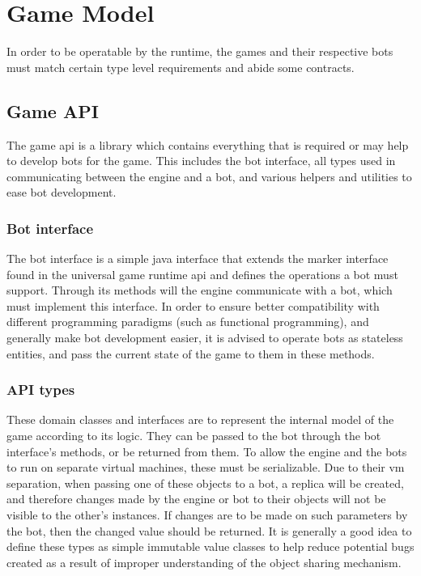 
%

\chapter{Game Model}\label{sect:GameModel}

In order to be operatable by the runtime, the games and their respective bots must match certain type level requirements and abide some contracts.

	\section{Game API}
	
	The game api is a library which contains everything that is required or may help to develop bots for the game. This includes the bot interface, all types used in communicating between the engine and a bot, and various helpers and utilities to ease bot development.

		\subsection*{Bot interface}
		
		The bot interface is a simple java interface that extends the  marker interface found in the universal game runtime api and defines the operations a bot must support. Through its methods will the engine communicate with a bot, which must implement this interface. In order to ensure better compatibility with different programming paradigms (such as functional programming), and generally make bot development easier, it is advised to operate bots as stateless entities, and pass the current state of the game to them in these methods. 
		
		\subsection*{API types}

		These domain classes and interfaces are to represent the internal model of the game according to its logic. They can be passed to the bot through the bot interface's methods, or be returned from them. To allow the engine and the bots to run on separate virtual machines, these must be serializable. Due to their vm separation, when passing one of these objects to a bot, a replica will be created, and therefore changes made by the engine or bot to their objects will not be visible to the other's instances. If changes are to be made on such parameters by the bot, then the changed value should be returned. It is generally a good idea to define these types as simple immutable value classes to help reduce potential bugs created as a result of improper understanding of the object sharing mechanism.
		
